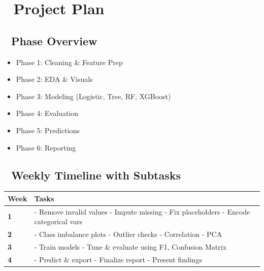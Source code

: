 \documentclass[
  10pt,
]{article}
\providecommand{\tightlist}{%
  \setlength{\itemsep}{0pt}\setlength{\parskip}{0pt}}\usepackage{longtable,booktabs,array}
\begin{document}
\section{🧭 Project Plan}\label{project-plan}

\subsection{📅 Phase Overview}\label{phase-overview}

\begin{itemize}
\tightlist
\item
  Phase 1: Cleaning \& Feature Prep\\
\item
  Phase 2: EDA \& Visuals\\
\item
  Phase 3: Modeling (Logistic, Tree, RF, XGBoost)\\
\item
  Phase 4: Evaluation\\
\item
  Phase 5: Predictions\\
\item
  Phase 6: Reporting
\end{itemize}

\subsection{📆 Weekly Timeline with
Subtasks}\label{weekly-timeline-with-subtasks}

\begin{longtable}[]{@{}
  >{\raggedright\arraybackslash}p{}
  >{\raggedright\arraybackslash}p{}@{}}
\toprule\noalign{}
\begin{minipage}[b]{\linewidth}\raggedright
Week
\end{minipage} & \begin{minipage}[b]{\linewidth}\raggedright
Tasks
\end{minipage} \\
\midrule\noalign{}
\endhead
\bottomrule\noalign{}
\endlastfoot
\textbf{1} & - Remove invalid values - Impute missing - Fix placeholders
- Encode categorical vars \\
\textbf{2} & - Class imbalance plots - Outlier checks - Correlation -
PCA \\
\textbf{3} & - Train models - Tune \& evaluate using F1, Confusion
Matrix \\
\textbf{4} & - Predict \& export - Finalize report - Present findings \\
\end{longtable}
\end{document}

